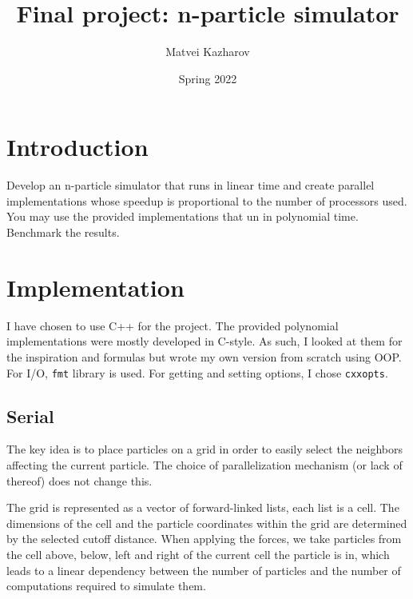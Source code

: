 \documentclass[a4paper,11pt]{article}
\title{
    \textbf{Final project: n-particle simulator}
}
\author{Matvei Kazharov}
\date{Spring 2022}
\begin{document}
\maketitle

\section*{Introduction}

\begin{quotationbox}{}
    Develop an n-particle simulator that runs in linear time and create
    parallel implementations whose speedup is proportional to the number of
    processors used. You may use the provided implementations that un in polynomial time.
    Benchmark the results.
\end{quotationbox}

\section{Implementation}
I have chosen to use C++ for the project. The provided polynomial
implementations were mostly developed in C-style. As such, I looked at them for
the inspiration and formulas but wrote my own version from scratch using OOP.
For I/O, \texttt{fmt} library is used. For getting and setting options, I chose \texttt{cxxopts}.

\subsection{Serial}
The key idea is to place particles on a grid in order to easily select the
neighbors affecting the current particle. The choice of parallelization
mechanism (or lack of thereof) does not change this.

The grid is represented as a vector of forward-linked lists, each list is a cell.
The dimensions of the cell and the particle coordinates within the grid are determined by
the selected cutoff distance. When applying the forces, we take particles from
the cell above, below, left and right of the current cell the particle is in, which
leads to a linear dependency between the number of particles and the number of
computations required to simulate them.
\end{document}
